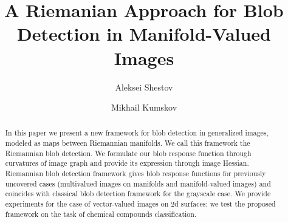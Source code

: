 \documentclass{llncs}
\begin{document}
\title{A Riemanian Approach for Blob Detection in Manifold-Valued Images}
%

\author{Aleksei Shestov \and Mikhail Kumskov} 
%



\maketitle              %

\begin{abstract}
%
In this paper we present a new framework for blob detection in generalized images, modeled as maps between Riemannian manifolds. We call this framework the Riemannian blob detection. We formulate our blob response function through curvatures of image graph and provide its expression through image Hessian. Riemannian blob detection framework gives blob response functions for previously uncovered cases (multivalued images on manifolds and manifold-valued images) and coincides with classical blob detection framework for the grayscale case. We provide experiments for the case of vector-valued images on 2d surfaces: we test the proposed framework on the task of chemical compounds classification.
 \end{abstract}  
%
\end{document}
